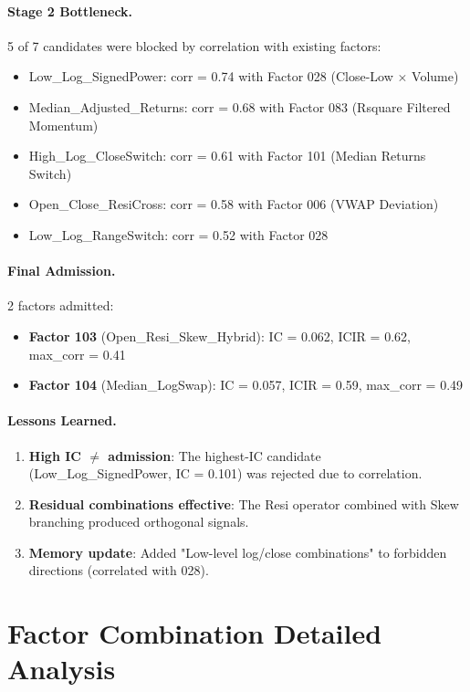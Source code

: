 \documentclass[sigconf]{acmart}
\begin{document}
\paragraph{Stage 2 Bottleneck.}
5 of 7 candidates were blocked by correlation with existing factors:
{\setlength{\leftmargini}{1.4em}%
\begin{itemize}
  \item Low\_Log\_SignedPower: corr = 0.74 with Factor 028 (Close-Low $\times$ Volume)
  \item Median\_Adjusted\_Returns: corr = 0.68 with Factor 083 (Rsquare Filtered Momentum)
  \item High\_Log\_CloseSwitch: corr = 0.61 with Factor 101 (Median Returns Switch)
  \item Open\_Close\_ResiCross: corr = 0.58 with Factor 006 (VWAP Deviation)
  \item Low\_Log\_RangeSwitch: corr = 0.52 with Factor 028
\end{itemize}
}

\paragraph{Final Admission.}
2 factors admitted:
{\setlength{\leftmargini}{1.4em}%
\begin{itemize}
  \item \textbf{Factor 103} (Open\_Resi\_Skew\_Hybrid): IC = 0.062, ICIR = 0.62, max\_corr = 0.41
  \item \textbf{Factor 104} (Median\_LogSwap): IC = 0.057, ICIR = 0.59, max\_corr = 0.49
\end{itemize}
}

\paragraph{Lessons Learned.}
\begin{enumerate}
  \item \textbf{High IC $\neq$ admission}: The highest-IC candidate (Low\_Log\_SignedPower, IC = 0.101) was rejected due to correlation.
  \item \textbf{Residual combinations effective}: The Resi operator combined with Skew branching produced orthogonal signals.
  \item \textbf{Memory update}: Added "Low-level log/close combinations" to forbidden directions (correlated with 028).
\end{enumerate}

\section{Factor Combination Detailed Analysis}
\label{app:combo-detail}
\end{document}
